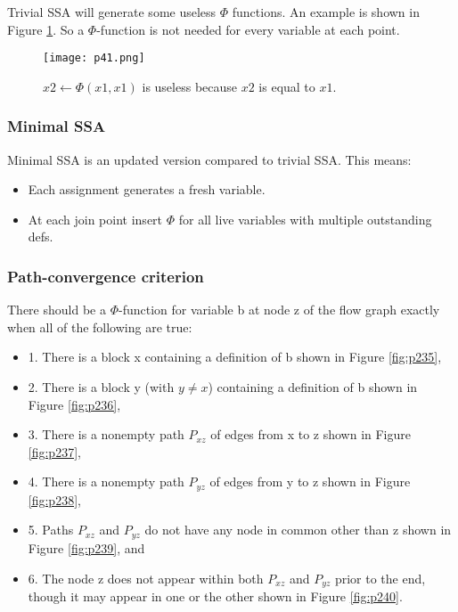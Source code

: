 Trivial SSA will generate some useless $\Phi$ functions. An example is shown in Figure \ref{fig:p41}. 
So a $\Phi$-function is not needed for every variable at each point.

\begin{figure}[H]
	\centering
	\texttt{[image: p41.png]}
	\caption{$x2 \leftarrow \Phi(x1,x1)$ is useless because $x2$ is equal to $x1$.}
	\label{fig:p41}

\end{figure}



\subsubsection{Minimal SSA}
Minimal SSA is an updated version compared to trivial SSA. This means:

\begin{itemize}
	\item Each assignment generates a fresh variable.
	\item At each join point insert $\Phi$ for all live variables with multiple outstanding defs.
\end{itemize}

\subsubsection{Path-convergence criterion}

There should be a $\Phi$-function for variable b at node z of the flow graph
exactly when all of the following are true:

\begin{itemize}
	\item 1. There is a block x containing a definition of b shown in Figure \ref{fig:p235},
	\item 2. There is a block y (with $y \neq x$) containing a definition of b shown in Figure \ref{fig:p236},
	\item 3. There is a nonempty path $P_{xz}$ of edges from x to z shown in Figure \ref{fig:p237},
	\item 4. There is a nonempty path $P_{yz}$ of edges from y to z shown in Figure \ref{fig:p238},
	\item 5. Paths $P_{xz}$ and $P_{yz}$ do not have any node in common other than z  shown in Figure \ref{fig:p239}, and
	\item 6. The node z does not appear within both $P_{xz}$ and $P_{yz}$ prior to the
	      end, though it may appear in one or the other shown in Figure \ref{fig:p240}.
\end{itemize}


